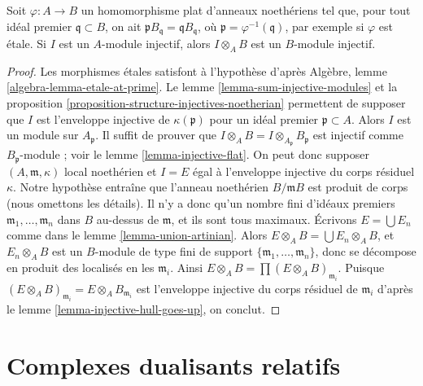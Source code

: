 \begin{lemma}
\label{lemma-injective-goes-up}
Soit $\varphi : A \to B$ un homomorphisme plat d'anneaux noethériens tel que,
pour tout idéal premier $\mathfrak q \subset B$, on ait $\mathfrak p B_\mathfrak q = \mathfrak qB_\mathfrak q$,
où $\mathfrak p = \varphi^{-1}(\mathfrak q)$, par exemple si $\varphi$ est \'etale.
Si $I$ est un $A$-module injectif, alors $I \otimes_A B$ est un $B$-module injectif.
\end{lemma}

\begin{proof}
Les morphismes \'etales satisfont à l'hypothèse d'après Algèbre, lemme \ref{algebra-lemma-etale-at-prime}.
Le lemme \ref{lemma-sum-injective-modules} et la proposition \ref{proposition-structure-injectives-noetherian} permettent de supposer que $I$
est l'enveloppe injective de $\kappa(\mathfrak p)$ pour un idéal premier $\mathfrak p \subset A$.
Alors $I$ est un module sur $A_\mathfrak p$.
Il suffit de prouver que $I \otimes_A B = I \otimes_{A_\mathfrak p} B_\mathfrak p$ est injectif comme $B_\mathfrak p$-module ; voir le lemme \ref{lemma-injective-flat}.
On peut donc supposer $(A, \mathfrak m, \kappa)$ local noethérien
et $I = E$ égal à l'enveloppe injective du corps résiduel $\kappa$.
Notre hypothèse entraîne que l'anneau noethérien $B/\mathfrak m B$
est produit de corps (nous omettons les détails).
Il n'y a donc qu'un nombre fini d'idéaux premiers $\mathfrak m_1, \ldots, \mathfrak m_n$ dans $B$
au-dessus de $\mathfrak m$, et ils sont tous maximaux.
Écrivons $E = \bigcup E_n$ comme dans le lemme \ref{lemma-union-artinian}.
Alors $E \otimes_A B = \bigcup E_n \otimes_A B$, et $E_n \otimes_A B$ est un $B$-module de type fini
de support $\{\mathfrak m_1, \ldots, \mathfrak m_n\}$, donc se décompose en produit des localisés en les $\mathfrak m_i$.
Ainsi $E \otimes_A B = \prod (E \otimes_A B)_{\mathfrak m_i}$.
Puisque $(E \otimes_A B)_{\mathfrak m_i} = E \otimes_A B_{\mathfrak m_i}$ est l'enveloppe injective du corps résiduel de $\mathfrak m_i$
d'après le lemme \ref{lemma-injective-hull-goes-up}, on conclut.
\end{proof}






\section{Complexes dualisants relatifs}
\label{section-relative-dualizing-complexes}

